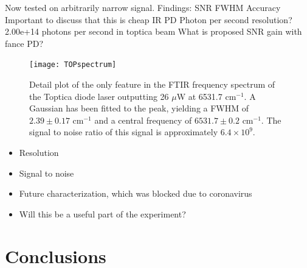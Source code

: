 \documentclass[12pt]{puthesis}
\newcommand{\wn}[1][ ]{cm$^{-1}$#1}
\begin{document}
Now tested on arbitrarily narrow signal. Findings:
SNR
FWHM
Accuracy
Important to discuss that this is cheap IR PD
Photon per second resolution?
2.00e+14 photons per second in toptica beam
What is proposed SNR gain with fance PD?


\begin{figure}[t]
  \centering
  \texttt{[image: TOPspectrum]}
  \caption{Detail plot of the only feature in the FTIR frequency spectrum of the Toptica diode laser outputting 26 $\mu$W at 6531.7 \wn[]. A Gaussian has been fitted to the peak, yielding a FWHM of $2.39 \pm 0.17$ \wn and a central frequency of $6531.7 \pm 0.2$ \wn[.] The signal to noise ratio of this signal is approximately $6.4\times 10^{9}$.}
  \label{fig:toptica}
\end{figure}




  
\begin{itemize}
\item Resolution

\item Signal to noise 

\item Future characterization, which was blocked due to coronavirus 

\item Will this be a useful part of the experiment?
\end{itemize}



\chapter{Conclusions}





\singlespacing

\cleardoublepage
\ifdefined{}
\else
\fi
{}

\end{document}
